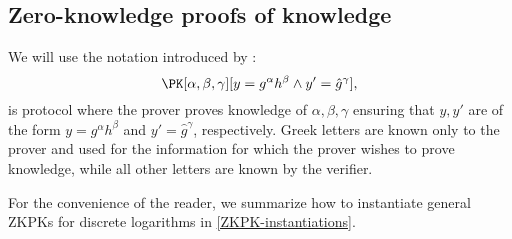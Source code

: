 \subsection{Zero-knowledge proofs of knowledge}%
\label{ZKPK}

We will use the notation introduced by \citet{PKnotation}:
\begin{equation}\label{PKexample}
  \PK[\alpha, \beta, \gamma][y = g^\alpha h^\beta \land y' = \hat g^\gamma],
\end{equation}
is  protocol where the prover proves knowledge of \(\alpha, \beta, 
\gamma\) ensuring that \(y, y'\) are of the form \(y = g^\alpha h^\beta\) and 
\(y' = \hat g^\gamma\), respectively.
Greek letters are known only to the prover and used for the information for which the prover wishes to prove knowledge, while all other letters are known by the verifier.


For the convenience of the reader, we summarize how to instantiate general 
\acp{ZKPK} for discrete logarithms in \cref{ZKPK-instantiations}.


